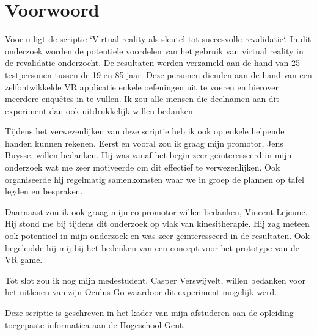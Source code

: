 
\chapter*{Voorwoord}
\label{ch:voorwoord}


Voor u ligt de scriptie `Virtual reality als sleutel tot succesvolle revalidatie`. In dit onderzoek worden de potentiele voordelen van het gebruik van virtual reality in de revalidatie onderzocht. De resultaten werden verzameld aan de hand van 25 testpersonen tussen de 19 en 85 jaar. Deze personen dienden aan de hand van een zelfontwikkelde VR applicatie enkele oefeningen uit te voeren en hierover meerdere enquêtes in te vullen. Ik zou alle mensen die deelnamen aan dit experiment dan ook uitdrukkelijk willen bedanken.

Tijdens het verwezenlijken van deze scriptie heb ik ook op enkele helpende handen kunnen rekenen. Eerst en vooral zou ik graag mijn promotor, Jens Buysse, willen bedanken. Hij was vanaf het begin zeer geïnteresseerd in mijn onderzoek wat me zeer motiveerde om dit effectief te verwezenlijken. Ook organiseerde hij regelmatig samenkomsten waar we in groep de plannen op tafel legden en bespraken.

Daarnaast zou ik ook graag mijn co-promotor willen bedanken, Vincent Lejeune. Hij stond me bij tijdens dit onderzoek op vlak van kinesitherapie. Hij zag meteen ook potentieel in mijn onderzoek en was zeer geïnteresseerd in de resultaten. Ook begeleidde hij mij bij het bedenken van een concept voor het prototype van de VR game.

Tot slot zou ik nog mijn medestudent, Casper Verswijvelt, willen bedanken voor het uitlenen van zijn Oculus Go waardoor dit experiment mogelijk werd.

 Deze scriptie is geschreven in het kader van mijn afstuderen aan de opleiding toegepaste informatica aan de Hogeschool Gent.